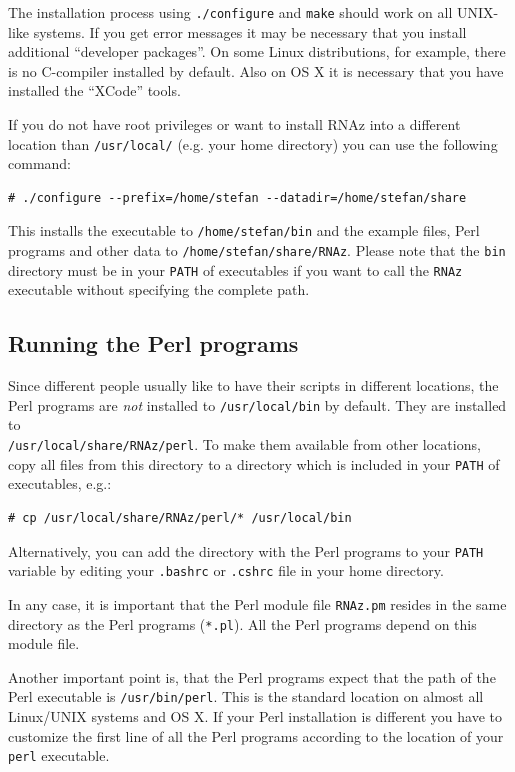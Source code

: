 \documentclass[11pt]{article}
\begin{document}
The installation process using \texttt{./configure} and \texttt{make}
should work on all UNIX-like systems. If you get error messages it may be
necessary that you install additional ``developer packages''. On some Linux
distributions, for example, there is no C-compiler installed by default.
Also on OS X it is necessary that you have installed the ``XCode'' tools.

If you do not have root privileges or want to install RNAz into a different
location than \texttt{/usr/local/} (e.g. your home directory) you can use
the following command:

\begin{verbatim}
# ./configure --prefix=/home/stefan --datadir=/home/stefan/share
\end{verbatim}

This installs the executable to \texttt{/home/stefan/bin} and the example
files, Perl programs and other data to \texttt{/home/stefan/share/RNAz}.
Please note that the \texttt{bin} directory must be in your \texttt{PATH}
of executables if you want to call the \texttt{RNAz} executable without
specifying the complete path.

\subsection{Running the Perl programs}
\label{sec:inst-runn-perl}

Since different people usually like to have their scripts in different
locations, the Perl programs are \emph{not} installed to
\texttt{/usr/local/bin} by default. They are installed to\\
\texttt{/usr/local/share/RNAz/perl}. To make them available from other
locations, copy all files from this directory to a directory which is
included in your \texttt{PATH} of executables, e.g.:

\begin{verbatim}
# cp /usr/local/share/RNAz/perl/* /usr/local/bin
\end{verbatim}

Alternatively, you can add the directory with the Perl programs to your
\texttt{PATH} variable by editing your \texttt{.bashrc} or \texttt{.cshrc}
file in your home directory.

In any case, it is important that the Perl module file \texttt{RNAz.pm}
resides in the same directory as the Perl programs (\texttt{*.pl}). All the
Perl programs depend on this module file.

Another important point is, that the Perl programs expect that the path of
the Perl executable is \texttt{/usr/bin/perl}. This is the standard
location on almost all Linux/UNIX systems and OS X. If your Perl
installation is different you have to customize the first line of all the
Perl programs according to the location of your \texttt{perl} executable.
\end{document}
